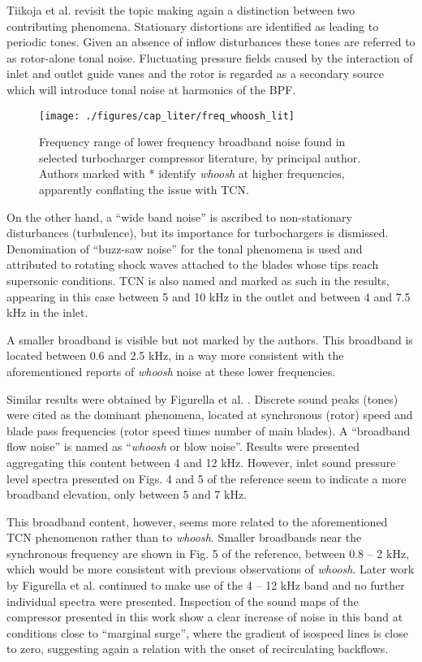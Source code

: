 Tiikoja et al. \cite{tiikoja2011inves} revisit the topic making again a distinction between two contributing phenomena. Stationary distortions are identified as leading to periodic tones. Given an absence of inflow disturbances these tones are referred to as rotor-alone tonal noise. Fluctuating pressure fields caused by the interaction of inlet and outlet guide vanes and the rotor is regarded as a secondary source which will introduce tonal noise at harmonics of the BPF. 

\begin{wrapfigure}{o}[1.5cm]{0.4\textwidth}
\centering
\vspace{2mm}
\texttt{[image: ./figures/cap\_liter/freq\_whoosh\_lit]}
\caption[Range of some broadband noises found in the literature]{Frequency range of lower frequency broadband noise found in selected turbocharger compressor literature, by principal author. Authors marked with * identify \emph{whoosh} at higher frequencies, apparently conflating the issue with TCN.}
\label{fig:freq_whoosh_lit}
\end{wrapfigure}

On the other hand, a ``wide band noise'' is ascribed to non-stationary disturbances (turbulence), but its importance for turbochargers is dismissed. Denomination of ``buzz-saw noise'' for the tonal phenomena is used and attributed to rotating shock waves attached to the blades whose tips reach supersonic conditions. TCN is also named and marked as such in the results, appearing in this case between 5 and 10 kHz in the outlet and between 4 and 7.5 kHz in the inlet. 

A smaller broadband is visible but not marked by the authors. This broadband is located between 0.6 and 2.5 kHz, in a way more consistent with the aforementioned reports of \emph{whoosh} noise at these lower frequencies.

Similar results were obtained by Figurella et al. \cite{figurella2012noise}. Discrete sound peaks (tones) were cited as the dominant phenomena, located at synchronous (rotor) speed and blade pass frequencies (rotor speed times number of main blades). A ``broadband flow noise'' is named as ``\emph{whoosh} or blow noise''. Results were presented aggregating this content between 4 and 12 kHz. However, inlet sound pressure level spectra presented on Figs. 4 and 5 of the reference seem to indicate a more broadband elevation, only between 5 and 7 kHz. 

This broadband content, however, seems more related to the aforementioned TCN phenomenon rather than to \emph{whoosh}. Smaller broadbands near the synchronous frequency are shown in Fig. 5 of the reference, between 0.8 -- 2 kHz, which would be more consistent with previous observations of \emph{whoosh}. Later work by Figurella et al. \cite{figurella2014effect} continued to make use of the 4 -- 12 kHz band and no further individual spectra were presented. Inspection of the sound maps of the compressor presented in this work show a clear increase of noise in this band at conditions close to ``marginal surge'', where the gradient of isospeed lines is close to zero, suggesting again a relation with the onset of recirculating backflows.

